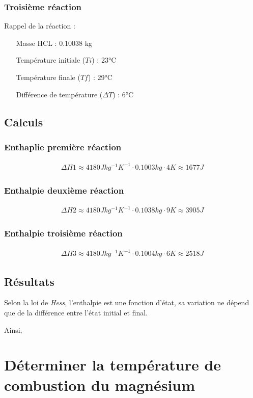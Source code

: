 \documentclass[a4paper, 12pt]{article}
\begin{document}
\subsubsection{Troisième réaction}
Rappel de la réaction : 
\begin{center}
\end{center}

\begin{itemize}
    \item[Masse HCL : ] 0.10038 kg
    \item[Température initiale \ce{HCl} ($Ti$) :] 23°C 
    \item[Température finale ($Tf$) :] 29°C  
    \item[Différence de température ($\Delta T$) :] 6°C  
\end{itemize}

\subsection{Calculs}
\subsubsection{Enthaplie première réaction}
\begin{align*}
    \Delta H1 \approx 4180 Jkg^{-1}K^{-1} \cdot 0.1003kg \cdot 4K \approx 1677 J
\end{align*}

\subsubsection{Enthalpie deuxième réaction}
\begin{align*}
    \Delta H2 \approx 4180 Jkg^{-1}K^{-1} \cdot 0.1038kg \cdot 9K \approx 3905 J
\end{align*}

\subsubsection{Enthalpie troisième réaction}
\begin{align*}
    \Delta H3 \approx 4180 Jkg^{-1}K^{-1} \cdot 0.1004kg \cdot 6K \approx 2518 J
\end{align*}

\subsection{Résultats}
Selon la loi de \textit{Hess}, l'enthalpie est une fonction d'état, sa variation
ne dépend que de la différence entre l'état initial et final.

Ainsi, 

\section{Déterminer la température de combustion du magnésium}
\end{document}
